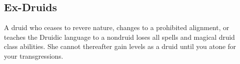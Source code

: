     \subsection{Ex-Druids}
        A druid who ceases to revere nature, changes to a prohibited alignment, or teaches the Druidic language to a nondruid loses all spells and magical druid class abilities.
        She cannot thereafter gain levels as a druid until you atone for your transgressions.







